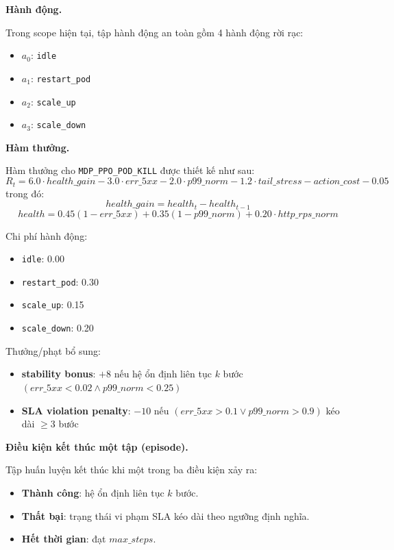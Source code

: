 \noindent\textbf{Hành động.}

\noindent Trong scope hiện tại, tập hành động an toàn gồm 4 hành động rời rạc:
\begin{itemize}
    \item $a_0$: \texttt{idle}
    \item $a_1$: \texttt{restart\_pod}
    \item $a_2$: \texttt{scale\_up}
    \item $a_3$: \texttt{scale\_down}
\end{itemize}


\noindent\textbf{Hàm thưởng.}

\noindent Hàm thưởng cho \texttt{MDP\_PPO\_POD\_KILL} được thiết kế như sau:
\begingroup
\small
\[
R_t = 6.0 \cdot health\_gain - 3.0 \cdot err\_{5xx} - 2.0 \cdot p99\_norm - 1.2 \cdot tail\_stress - action\_cost - 0.05
\]
\endgroup
\noindent trong đó:
\[
health\_gain = health_t - health_{t-1}
\]
\[
health = 0.45(1-err\_{5xx}) + 0.35(1-p99\_norm) + 0.20 \cdot http\_rps\_norm
\]

\noindent Chi phí hành động:
\begin{itemize}
    \item \texttt{idle}: 0.00
    \item \texttt{restart\_pod}: 0.30
    \item \texttt{scale\_up}: 0.15
    \item \texttt{scale\_down}: 0.20
\end{itemize}

\noindent Thưởng/phạt bổ sung:
\begin{itemize}
    \item \textbf{stability bonus}: $+8$ nếu hệ ổn định liên tục $k$ bước $(err\_{5xx}<0.02 \land p99\_norm<0.25)$
    \item \textbf{SLA violation penalty}: $-10$ nếu $(err\_{5xx}>0.1 \lor p99\_norm>0.9)$ kéo dài $\ge 3$ bước
\end{itemize}

\noindent\textbf{Điều kiện kết thúc một tập (episode).}

\noindent Tập huấn luyện kết thúc khi một trong ba điều kiện xảy ra:
\begin{itemize}
    \item \textbf{Thành công}: hệ ổn định liên tục $k$ bước.
    \item \textbf{Thất bại}: trạng thái vi phạm SLA kéo dài theo ngưỡng định nghĩa.
    \item \textbf{Hết thời gian}: đạt $max\_steps$.
\end{itemize}

